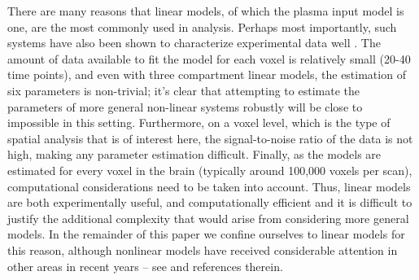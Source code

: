 There are many reasons that linear \ode models, of which the plasma input
model is one, are the most commonly used in \pet analysis. Perhaps most
importantly, such systems have also been shown to characterize \pet
experimental data well \cite{Lammertsma96}. The amount of data available
to fit the model for each voxel is relatively small (20-40 time points),
and even with three compartment linear \ode models, the estimation of six
parameters is non-trivial; it's clear that attempting to estimate the
parameters of more general non-linear \ode systems robustly will be close
to impossible in this setting. Furthermore, on a voxel level, which is the
type of spatial analysis that is of interest here, the signal-to-noise
ratio of the data is not high, making any parameter estimation difficult.
Finally, as the models are estimated for every voxel in the brain
(typically around 100,000 voxels per scan), computational considerations
need to be taken into account. Thus, linear \ode models are both
experimentally useful, and computationally efficient and it is difficult to
justify the additional complexity that would arise from considering more
general models. In the remainder of this paper we confine ourselves to
linear \ode models for this reason, although nonlinear \ode models have
received considerable attention in other areas in recent years -- see
\cite{Lawson2011} and references therein.

